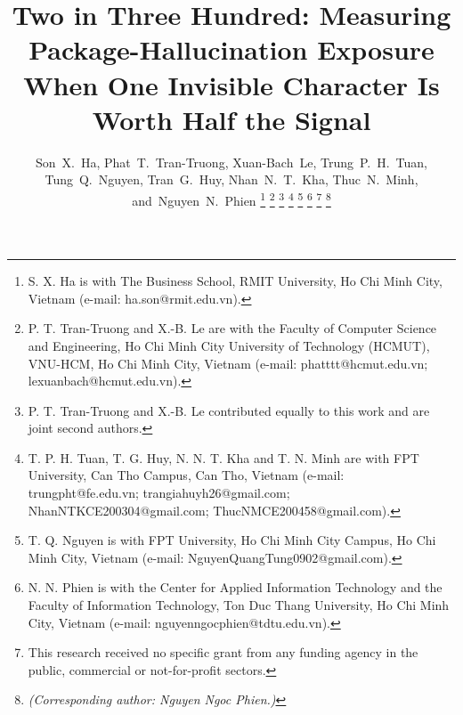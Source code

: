 \documentclass[journal]{IEEEtran}
\theoremstyle{definition}
\begin{document}
\title{Two in Three Hundred: Measuring Package-Hallucination Exposure When One Invisible Character Is Worth Half the Signal}

\author{%
  Son~X.~Ha,
  Phat~T.~Tran-Truong,
  Xuan-Bach~Le,
  Trung~P.~H.~Tuan,
  Tung~Q.~Nguyen,
  Tran~G.~Huy,
  Nhan~N.~T.~Kha,
  Thuc~N.~Minh,
  and~Nguyen~N.~Phien%
  \thanks{S. X. Ha is with The Business School, RMIT University,
    Ho Chi Minh City, Vietnam (e-mail: ha.son@rmit.edu.vn).}%
  \thanks{P. T. Tran-Truong and X.-B. Le are with the Faculty of Computer
    Science and Engineering, Ho Chi Minh City University of Technology (HCMUT),
    VNU-HCM, Ho Chi Minh City, Vietnam
    (e-mail: phatttt@hcmut.edu.vn; lexuanbach@hcmut.edu.vn).}%
  \thanks{P. T. Tran-Truong and X.-B. Le contributed equally to this work
    and are joint second authors.}%
  \thanks{T. P. H. Tuan, T. G. Huy, N. N. T. Kha and T. N. Minh are with
    FPT University, Can Tho Campus, Can Tho, Vietnam
    (e-mail: trungpht@fe.edu.vn; trangiahuyh26@gmail.com;
    NhanNTKCE200304@gmail.com; ThucNMCE200458@gmail.com).}%
  \thanks{T. Q. Nguyen is with FPT University, Ho Chi Minh City Campus,
    Ho Chi Minh City, Vietnam (e-mail: NguyenQuangTung0902@gmail.com).}%
  \thanks{N. N. Phien is with the Center for Applied Information
    Technology and the Faculty of Information Technology, Ton Duc Thang
    University, Ho Chi Minh City, Vietnam
    (e-mail: nguyenngocphien@tdtu.edu.vn).}%
  \thanks{This research received no specific grant from any funding agency in the public, commercial or not-for-profit sectors.}%
  \thanks{\emph{(Corresponding author: Nguyen Ngoc Phien.)}}%
}

\maketitle
\end{document}
